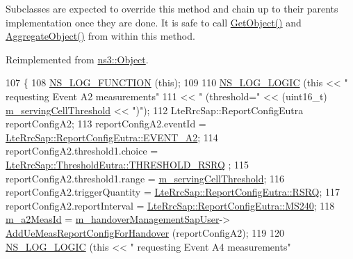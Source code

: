 Subclasses are expected to override this method and chain up to their parent\textquotesingle{}s implementation once they are done. It is safe to call \hyperlink{classns3_1_1Object_a13e18c00017096c8381eb651d5bd0783}{Get\+Object()} and \hyperlink{classns3_1_1Object_a79dd435d300f3deca814553f561a2922}{Aggregate\+Object()} from within this method. 

Reimplemented from \hyperlink{classns3_1_1Object_af8482a521433409fb5c7f749398c9dbe}{ns3\+::\+Object}.


\begin{DoxyCode}
107 \{
108   \hyperlink{log-macros-disabled_8h_a90b90d5bad1f39cb1b64923ea94c0761}{NS\_LOG\_FUNCTION} (\textcolor{keyword}{this});
109 
110   \hyperlink{group__logging_ga88acd260151caf2db9c0fc84997f45ce}{NS\_LOG\_LOGIC} (\textcolor{keyword}{this} << \textcolor{stringliteral}{" requesting Event A2 measurements"}
111                      << \textcolor{stringliteral}{" (threshold="} << (uint16\_t) \hyperlink{classns3_1_1A2A4RsrqHandoverAlgorithm_acb5609bb57548a7cd9fe92fbef4dd99b}{m\_servingCellThreshold} << \textcolor{stringliteral}{")"});
112   LteRrcSap::ReportConfigEutra reportConfigA2;
113   reportConfigA2.eventId = \hyperlink{structns3_1_1LteRrcSap_1_1ReportConfigEutra_ab8152dc095987f60bee2e9115046902fa11aae7a908ccf8a73b5aeed0cd8be53e}{LteRrcSap::ReportConfigEutra::EVENT\_A2};
114   reportConfigA2.threshold1.choice = \hyperlink{structns3_1_1LteRrcSap_1_1ThresholdEutra_ad3ed2704b836132980dd2e97cb03822ca6e8bda2b99825f09f53388c29b6402b4}{LteRrcSap::ThresholdEutra::THRESHOLD\_RSRQ}
      ;
115   reportConfigA2.threshold1.range = \hyperlink{classns3_1_1A2A4RsrqHandoverAlgorithm_acb5609bb57548a7cd9fe92fbef4dd99b}{m\_servingCellThreshold};
116   reportConfigA2.triggerQuantity = \hyperlink{structns3_1_1LteRrcSap_1_1ReportConfigEutra_a82343ddf526faba0483431ea5882a3efaa4e09cb3c7154d7ab732115a2647325f}{LteRrcSap::ReportConfigEutra::RSRQ};
117   reportConfigA2.reportInterval = \hyperlink{structns3_1_1LteRrcSap_1_1ReportConfigEutra_aa04b2781a844eb212d59762829e41d31a7426f1e7502aa2b643e3723b2ca5caaf}{LteRrcSap::ReportConfigEutra::MS240};
118   \hyperlink{classns3_1_1A2A4RsrqHandoverAlgorithm_ac52e42e6ee41a0faffdcbc75ff7e2e02}{m\_a2MeasId} = \hyperlink{classns3_1_1A2A4RsrqHandoverAlgorithm_a117b9e0cb1751dc8b2b96532c2915679}{m\_handoverManagementSapUser}->
      \hyperlink{classns3_1_1LteHandoverManagementSapUser_a80f34ec0e586b42547210c1741b4f980}{AddUeMeasReportConfigForHandover} (reportConfigA2);
119 
120   \hyperlink{group__logging_ga88acd260151caf2db9c0fc84997f45ce}{NS\_LOG\_LOGIC} (\textcolor{keyword}{this} << \textcolor{stringliteral}{" requesting Event A4 measurements"}

\end{DoxyCode}
